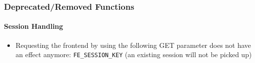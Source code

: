 %

\begin{frame}[fragile]
	\frametitle{Deprecated/Removed Functions}
	\framesubtitle{Session Handling}

	\begin{itemize}

		\item Requesting the frontend by using the following GET parameter does
			not have an effect anymore: \small\texttt{FE\_SESSION\_KEY}\normalsize\newline
			\small(an existing session will not be picked up)\normalsize

	\end{itemize}

\end{frame}

